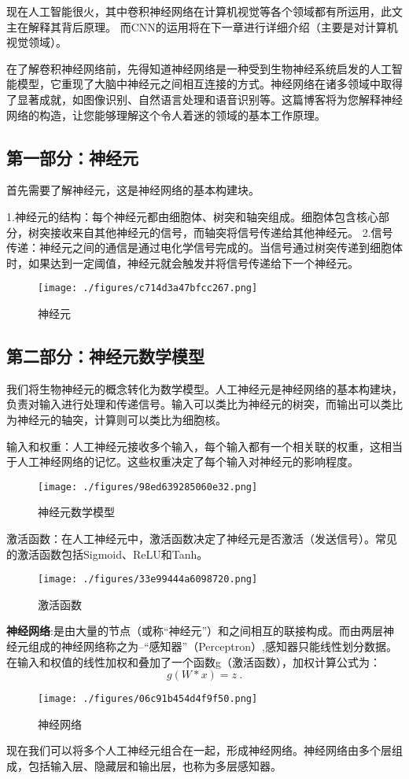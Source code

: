 现在人工智能很火，其中卷积神经网络在计算机视觉等各个领域都有所运用，此文主在解释其背后原理。
而CNN的运用将在下一章进行详细介绍（主要是对计算机视觉领域）。

在了解卷积神经网络前，先得知道神经网络是一种受到生物神经系统启发的人工智能模型，它重现了大脑中神经元之间相互连接的方式。神经网络在诸多领域中取得了显著成就，如图像识别、自然语言处理和语音识别等。这篇博客将为您解释神经网络的构造，让您能够理解这个令人着迷的领域的基本工作原理。
\subsection{第一部分：神经元 }
首先需要了解神经元，这是神经网络的基本构建块。

1.神经元的结构：每个神经元都由细胞体、树突和轴突组成。细胞体包含核心部分，树突接收来自其他神经元的信号，而轴突将信号传递给其他神经元。
2.信号传递：神经元之间的通信是通过电化学信号完成的。当信号通过树突传递到细胞体时，如果达到一定阈值，神经元就会触发并将信号传递给下一个神经元。
\begin{figure}[ht]
\centering
\texttt{[image: ./figures/c714d3a47bfcc267.png]}
\caption{神经元} \label{fig_CNN1_1}
\end{figure}

\subsection{第二部分：神经元数学模型 }
我们将生物神经元的概念转化为数学模型。人工神经元是神经网络的基本构建块，负责对输入进行处理和传递信号。输入可以类比为神经元的树突，而输出可以类比为神经元的轴突，计算则可以类比为细胞核。

输入和权重：人工神经元接收多个输入，每个输入都有一个相关联的权重，这相当于人工神经网络的记忆。这些权重决定了每个输入对神经元的影响程度。\begin{figure}[ht]
\centering
\texttt{[image: ./figures/98ed639285060e32.png]}
\caption{神经元数学模型} \label{fig_CNN1_2}
\end{figure}
激活函数：在人工神经元中，激活函数决定了神经元是否激活（发送信号）。常见的激活函数包括Sigmoid、ReLU和Tanh。
\begin{figure}[ht]
\centering
\texttt{[image: ./figures/33e99444a6098720.png]}
\caption{激活函数} \label{fig_CNN1_3}
\end{figure}

\textbf{神经网络}:是由大量的节点（或称“神经元”）和之间相互的联接构成。而由两层神经元组成的神经网络称之为--“感知器”（Perceptron）,感知器只能线性划分数据。在输入和权值的线性加权和叠加了一个函数g（激活函数），加权计算公式为：
\begin{equation}
g(W * x) = z~.
\end{equation}
\begin{figure}[ht]
\centering
\texttt{[image: ./figures/06c91b454d4f9f50.png]}
\caption{神经网络} \label{fig_CNN1_4}
\end{figure}
现在我们可以将多个人工神经元组合在一起，形成神经网络。神经网络由多个层组成，包括输入层、隐藏层和输出层，也称为多层感知器。